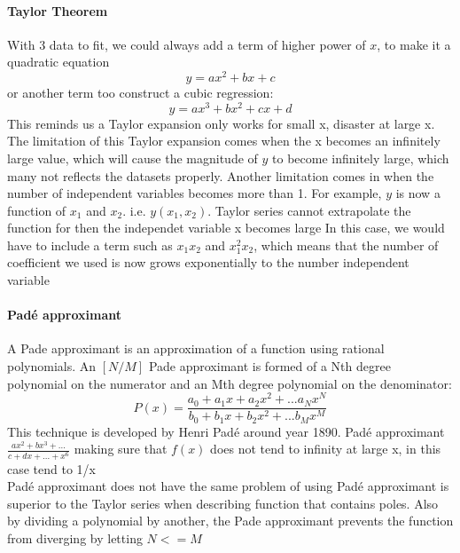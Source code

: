 \documentclass[12pt,a4paper]{article}
\begin{document}
\paragraph{Taylor Theorem}
With 3 data to fit,  we could always add a term of higher power of $x$, to make it a quadratic equation
\begin{equation}
    y= ax^2 +bx+ c
\end{equation}
or another term too construct a cubic regression:
\begin{equation}
    y= ax^3 +bx^2 + cx+d
\end{equation}
This reminds us a 
Taylor expansion only works for small x, disaster at large x.
The limitation of this Taylor expansion comes when the x becomes an infinitely large value, which will cause the magnitude of $y$ to become infinitely large, which many not reflects the datasets properly. 
Another limitation comes in when the number of independent variables becomes more than 1. For example, $y$ is now a function of $x_1$ and $x_2$. i.e. $y(x_1,x_2)$.
Taylor series cannot extrapolate the function for then the independet variable x becomes large
In this case, we would have to include a term such as $x_1x_2$ and $x_1^2x_2$, which means that the number of coefficient we used is now grows exponentially to the number independent variable 

\paragraph{Padé approximant}
A Pade approximant is an approximation of a function using rational polynomials.
An $[N/M]$ Pade approximant is formed of a Nth degree polynomial on the numerator and an Mth degree polynomial on the denominator:
\begin{equation}
    P(x)=\frac{a_0+a_1 x+a_2x^2+... a_Nx^N}{b_0+b_1 x+b_2x^2+... b_Mx^M}
\end{equation}
This technique is developed by Henri Padé around year 1890.
Padé approximant $\frac{ax^2+bx^3+...}{c+dx+...+x^6}$ making sure that $f(x)$ does not tend to infinity at large x, in this case tend to 1/x\\
Padé approximant does not have the same problem of using 
Padé approximant is superior to the Taylor series when describing function that contains poles. 
Also by dividing a polynomial by another, the Pade approximant prevents the function from diverging by letting $N<=M$
\end{document}
